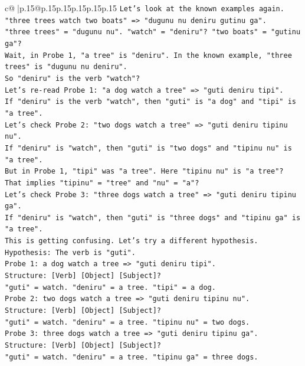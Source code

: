 \documentclass{article}
\begin{document}
{\begin{supertabular}{c@{$\;$}|p{.15\linewidth}@{}p{.15\linewidth}p{.15\linewidth}p{.15\linewidth}p{.15\linewidth}p{.15\linewidth}}
{{{\texttt{Let's look at the known examples again.} \\
\texttt{"three trees watch two boats" => "dugunu nu deniru gutinu ga".} \\
\texttt{"three trees" = "dugunu nu". "watch" = "deniru"? "two boats" = "gutinu ga"?} \\
\texttt{Wait, in Probe 1, "a tree" is "deniru". In the known example, "three trees" is "dugunu nu deniru".} \\
\texttt{So "deniru" is the verb "watch"?} \\
\texttt{Let's re{-}read Probe 1: "a dog watch a tree" => "guti deniru tipi".} \\
\texttt{If "deniru" is the verb "watch", then "guti" is "a dog" and "tipi" is "a tree".} \\
\texttt{Let's check Probe 2: "two dogs watch a tree" => "guti deniru tipinu nu".} \\
\texttt{If "deniru" is "watch", then "guti" is "two dogs" and "tipinu nu" is "a tree".} \\
\texttt{But in Probe 1, "tipi" was "a tree". Here "tipinu nu" is "a tree"? That implies "tipinu" = "tree" and "nu" = "a"?} \\
\texttt{Let's check Probe 3: "three dogs watch a tree" => "guti deniru tipinu ga".} \\
\texttt{If "deniru" is "watch", then "guti" is "three dogs" and "tipinu ga" is "a tree".} \\
\texttt{This is getting confusing. Let's try a different hypothesis.} \\
\texttt{Hypothesis: The verb is "guti".} \\
\texttt{Probe 1: a dog watch a tree => "guti deniru tipi".} \\
\texttt{Structure: {[}Verb{]} {[}Object{]} {[}Subject{]}?} \\
\texttt{"guti" = watch. "deniru" = a tree. "tipi" = a dog.} \\
\texttt{Probe 2: two dogs watch a tree => "guti deniru tipinu nu".} \\
\texttt{Structure: {[}Verb{]} {[}Object{]} {[}Subject{]}?} \\
\texttt{"guti" = watch. "deniru" = a tree. "tipinu nu" = two dogs.} \\
\texttt{Probe 3: three dogs watch a tree => "guti deniru tipinu ga".} \\
\texttt{Structure: {[}Verb{]} {[}Object{]} {[}Subject{]}?} \\
\texttt{"guti" = watch. "deniru" = a tree. "tipinu ga" = three dogs.} \\
}}}
\end{supertabular}}
\end{document}
